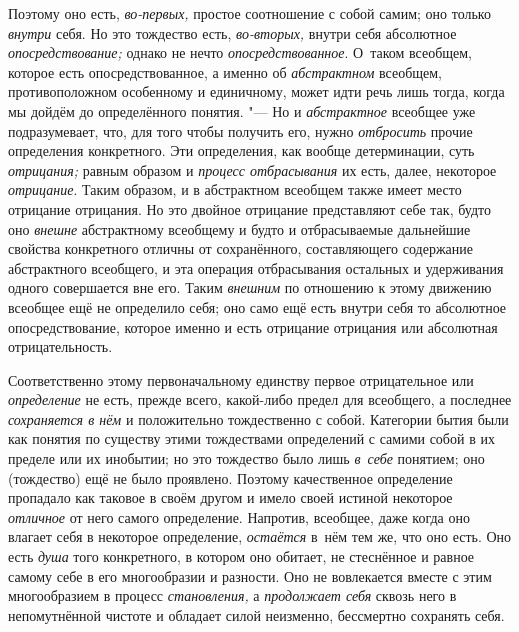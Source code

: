 Поэтому оно есть, {\em во-первых,} простое соотношение с собой самим; оно
только {\em внутри} себя. Но это тождество есть, {\em во-вторых,} внутри себя
абсолютное {\em опосредствование;} однако не нечто {\em опосредствованное}.
О~таком всеобщем, которое есть опосредствованное, а именно об {\em абстрактном}
всеобщем, противоположном особенному и единичному, может идти речь лишь тогда,
когда мы дойдём до определённого понятия. "--- Но и {\em абстрактное} всеобщее
уже подразумевает, что, для того чтобы получить его, нужно {\em отбросить}
прочие определения конкретного. Эти определения, как вообще детерминации, суть
{\em отрицания;} равным образом и {\em процесс отбрасывания} их есть, далее,
некоторое {\em отрицание}. Таким образом, и в абстрактном всеобщем также имеет
место отрицание отрицания. Но это двойное отрицание представляют себе так,
будто оно {\em внешне} абстрактному всеобщему и будто и отбрасываемые
дальнейшие свойства конкретного отличны от сохранённого, составляющего
содержание абстрактного всеобщего, и эта операция отбрасывания остальных и
удерживания одного совершается вне его. Таким {\em внешним} по отношению к
этому движению всеобщее ещё не определило себя; оно само ещё есть внутри себя
то абсолютное опосредствование, которое именно и есть отрицание отрицания или
абсолютная отрицательность.

Соответственно этому первоначальному единству первое отрицательное или
{\em определение} не есть, прежде всего, какой-либо предел для всеобщего,
а последнее {\em сохраняется в нём} и положительно тождественно с собой.
Категории бытия были как понятия по существу этими тождествами определений
с самими собой в их пределе или их инобытии; но это тождество было лишь
{\em в~себе} понятием; оно (тождество) ещё не было проявлено. Поэтому
качественное определение пропадало как таковое в своём другом и имело своей
истиной некоторое {\em отличное} от него самого определение. Напротив,
всеобщее, даже когда оно влагает себя в некоторое определение, {\em остаётся}
в~нём тем же, что оно есть. Оно есть {\em душа} того конкретного, в котором оно
обитает, не стеснённое и равное самому себе в его многообразии и разности. Оно
не вовлекается вместе с этим многообразием в процесс {\em становления,}
а {\em продолжает себя} сквозь него в непомутнённой чистоте и обладает силой
неизменно, бессмертно сохранять себя.

